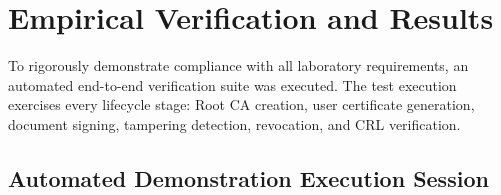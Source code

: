 \documentclass[12pt,a4paper]{article}
\begin{document}
\section{Empirical Verification and Results}

To rigorously demonstrate compliance with all laboratory requirements, an automated end-to-end verification suite was executed. The test execution exercises every lifecycle stage: Root CA creation, user certificate generation, document signing, tampering detection, revocation, and CRL verification.

\subsection{Automated Demonstration Execution Session}
\end{document}
